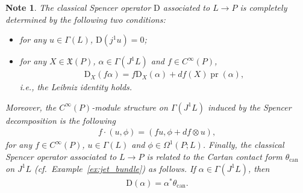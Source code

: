 \documentclass[pdftex]{sigma}
\numberwithin{equation}{section}
\newtheorem{Note}[Theorem]{Note}
\newcommand{\X}{\ensuremath{\mathfrak{X}}}
\begin{document}
\begin{Note}\label{obs:prop_cso}
The classical Spencer operator $\mathrm{D}$ associated to $L \to P$ is completely determined by the following two conditions:
 \begin{itemize}\itemsep=0pt
 \item for any $u \in \Gamma(L)$, $\mathrm{D}(j^1u)=0$;
 \item for any $X \in \X(P)$, $\alpha \in \Gamma(J^1L)$ and $f \in C^{\infty}(P)$,
 \begin{gather*}\mathrm{D}_X(f\alpha)=f\mathrm{D}_X(\alpha)+df(X)\operatorname{pr}(\alpha),\end{gather*}
 i.e., the Leibniz identity holds.
 \end{itemize}
Moreover, the $C^{\infty}(P)$-module structure on $\Gamma(J^1L) $ induced by the Spencer decomposition is the following
 \begin{gather*} f\cdot (u, \phi)= (f u, \phi+ df\otimes u),\end{gather*}
for any $f \in C^{\infty}(P)$, $u \in \Gamma(L)$ and $\phi \in \Omega^1(P;L)$. Finally, the classical Spencer operator associated to $L \to P$ is related to the Cartan contact form $\theta_{\mathrm{can}}$ on $J^1L$ (cf.\ Example~\ref{ex:jet_bundle}) as follows. If $\alpha \in \Gamma (J^1L )$, then
\begin{gather*}
\mathrm{D}(\alpha) = \alpha^* \theta_{\mathrm{can}}.
\end{gather*}
\end{Note}
\end{document}
